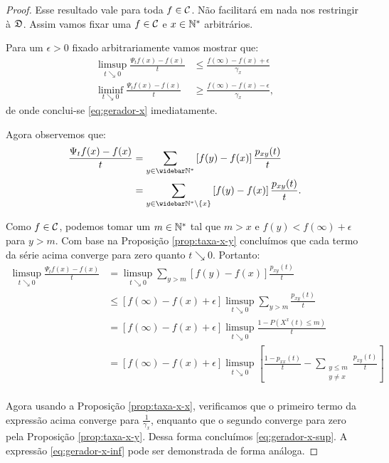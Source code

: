 \begin{proof}
  Esse resultado vale para toda $f \in {\mathcal{C}}$. Não facilitará em nada
  nos restringir à ${\mathfrak{D}}$. Assim vamos fixar uma $f \in {\mathcal{C}}$ e $x \in {\mathbb{N^*}}$
  arbitrários.

  Para um $\epsilon > 0$ fixado arbitrariamente vamos mostrar que:
  \begin{align}
    \label{eq:gerador-x-sup}
    \limsup_{t \searrow 0} \frac{\Psi_t f (x) - f(x)}{t} &\leq
    \frac{f(\infty) - f(x) + \epsilon}{\gamma_x}\\
    \label{eq:gerador-x-inf}
    \liminf_{t \searrow 0} \frac{\Psi_t f (x) - f(x)}{t} &\geq
    \frac{f(\infty) - f(x) - \epsilon}{\gamma_x}, 
  \end{align}
  de onde conclui-se \eqref{eq:gerador-x} imediatamente.

  Agora observemos que:
  \begin{align*}
    \frac{\Psi_t f(x) - f(x)}{t}
    &= \sum_{y \in \Nzb} \left[ f(y) - f(x) \right] \frac{p_{x y}(t)}{t}\\
    &=
    \sum_{y \in \Nzb\setminus\{x\}} \left[ f(y) - f(x) \right] \frac{p_{x y}(t)}{t}.
  \end{align*}


  Como $f \in {\mathcal{C}}$, podemos tomar um $m \in {\mathbb{N^*}}$ tal que $m > x$ e
  $f(y) < f(\infty) + \epsilon$ para $y > m$. Com base na Proposição
  \ref{prop:taxa-x-y} concluímos que cada termo da série acima
  converge para zero quanto $t \searrow 0$. Portanto:
  \begin{align*}
    \limsup_{t \searrow 0}
    \frac{\Psi_t f(x) - f(x)}{t}
    &= \limsup_{t \searrow 0}
    \sum_{y > m} \left[ f(y) - f(x) \right] \frac{p_{x y}(t)}{t}\\
    &\leq \left[ f(\infty) - f(x) + \epsilon \right] \limsup_{t \searrow 0} 
    \sum_{y > m} \frac{p_{x y}(t)}{t}\\
    &= \left[ f(\infty) - f(x) + \epsilon \right] \limsup_{t \searrow 0}
    \frac{1 - P\left( X^x(t) \leq m \right)}{t}\\
    &= \left[ f(\infty) - f(x) + \epsilon \right] \limsup_{t \searrow 0}
    \left[
      \frac{1 - p_{x x}(t)}{t}
      - \sum_{\substack{y \leq m \\ y\neq x}} \frac{p_{x y}(t)}{t}
    \right]\\
  \end{align*}

  Agora usando a Proposição \ref{prop:taxa-x-x}, verificamos que o
  primeiro termo da expressão acima converge para
  $\frac{1}{\gamma_x}$, enquanto que o segundo converge para zero pela
  Proposição \ref{prop:taxa-x-y}. Dessa forma concluímos
  \eqref{eq:gerador-x-sup}. A expressão \eqref{eq:gerador-x-inf} pode
  ser demonstrada de forma análoga.
\end{proof}



